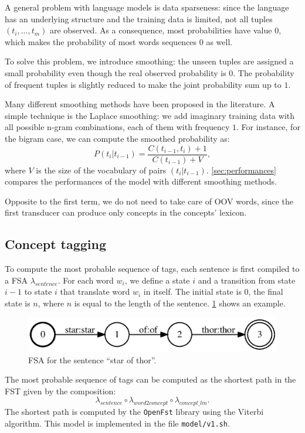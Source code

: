 A general problem with language models is data sparseness:
since the language has an underlying structure and the training data is limited, not all tuples $(t_i, ..., t_m)$ are observed.
As a consequence, most probabilities have value $0$, which makes the probability of most words sequences $0$ as well.

To solve this problem, we introduce smoothing:
the unseen tuples are assigned a small probability even though the real observed probability is $0$.
The probability of frequent tuples is slightly reduced to make the joint probability sum up to $1$.

Many different smoothing methods have been proposed in the literature.
A simple technique is the Laplace smoothing:
we add imaginary training data with all possible n-gram combinations, each of them with frequency $1$.
For instance, for the bigram case, we can compute the smoothed probability as:
\begin{equation*}
    P(t_i | t_{i-1}) = \frac{C(t_{i-1}, t_i) + 1}{C(t_{i-1}) + V},
\end{equation*}
where $V$ is the size of the vocabulary of pairs $(t_i | t_{i-1})$.
\cref{sec:performances} compares the performances of the model with different smoothing methods. 

Opposite to the first term, we do not need to take care of \ac{OOV} words, since the first transducer can produce only concepts in the concepts' lexicon.

\subsection{Concept tagging}
To compute the most probable sequence of tags, each sentence is first compiled to a \ac{FSA} $\lambda_{sentence}$.
For each word $w_i$, we define a state $i$ and a transition from state $i-1$ to state $i$ that translate word $w_i$ in itself.
The initial state is $0$, the final state is $n$, where $n$ is equal to the length of the sentence.
\cref{fig:fsa_sentence} shows an example.

\begin{figure}[h]
	\centering
	\includegraphics[width=.95\columnwidth]{figures/fsa}
	\caption{\ac{FSA} for the sentence ``star of thor''.}
	\label{fig:fsa_sentence}
\end{figure}

The most probable sequence of tags can be computed as the shortest path in the \ac{FST} given by the composition:
\begin{equation*}
    \lambda_{sentence} \circ \lambda_{word2concept} \circ \lambda_{concept\_lm}.
\end{equation*}
The shortest path is computed by the \texttt{OpenFst} library using the Viterbi algorithm.
This model is implemented in the file \texttt{model/v1.sh}.
